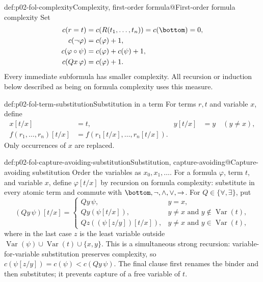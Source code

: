 \begin{hbdefinition}{def:p02-fol-complexity}{Complexity, first-order formula@First-order formula complexity}
Set
\[
\begin{aligned}
 c(r=t)&=c(R(t_1,\ldots,t_n))=c(\bottom)=0,\\
 c(\neg\varphi)&=c(\varphi)+1,\\
 c(\varphi\circ\psi)&=c(\varphi)+c(\psi)+1,\\
 c(Qx\,\varphi)&=c(\varphi)+1.
\end{aligned}
\]
Every immediate subformula has smaller complexity.  All recursion or
induction below described as being on formula complexity uses this measure.
\end{hbdefinition}

\begin{hbdefinition}{def:p02-fol-term-substitution}{Substitution in a term}
For terms \(r,t\) and variable \(x\), define
\[
\begin{aligned}
 x[t/x]&=t,&y[t/x]&=y\quad(y\ne x),\\
 f(r_1,\ldots,r_n)[t/x]
   &=f(r_1[t/x],\ldots,r_n[t/x]).
\end{aligned}
\]
Only occurrences of \(x\) are replaced.
\end{hbdefinition}

\begin{hbdefinition}{def:p02-fol-capture-avoiding-substitution}{Substitution, capture-avoiding@Capture-avoiding substitution}
Order the variables as \(x_0,x_1,\ldots\).  For a formula \(\varphi\), term
\(t\), and variable \(x\), define \(\varphi[t/x]\) by recursion on formula
complexity: substitute in every atomic term and commute with
\(\bottom,\neg,\land,\lor,\to\).  For
\(Q\in\{\forall,\exists\}\), put
\[
 (Qy\,\psi)[t/x]=
 \begin{cases}
  Qy\,\psi,&y=x,\\
  Qy(\psi[t/x]),&y\ne x\text{ and }y\notin\operatorname{Var}(t),\\
  Qz((\psi[z/y])[t/x]),&y\ne x\text{ and }y\in\operatorname{Var}(t),
 \end{cases}
\]
where in the last case \(z\) is the least variable outside
\(\operatorname{Var}(\psi)\cup\operatorname{Var}(t)\cup\{x,y\}\).
This is a simultaneous strong recursion: variable-for-variable substitution
preserves complexity, so
\(c(\psi[z/y])=c(\psi)<c(Qy\,\psi)\).  The final clause first renames the
binder and then substitutes; it prevents capture of a free variable of
\(t\).
\end{hbdefinition}

